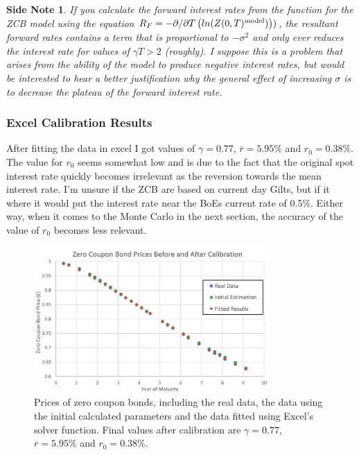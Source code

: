 \documentclass[10pt,a4paper]{article}
\theoremstyle{definition}
\theoremstyle{plain}
\theoremstyle{definition}
\theoremstyle{plain}
\newtheorem{sidenote}{Side Note}[section]
\begin{document}
\theoremstyle{plain}
\begin{sidenote}{}
If you calculate the forward interest rates from the function for the ZCB model using the equation $R_{F}=-\partial / \partial T \left( ln(Z(0,T)^{\rm{model}}) \right))$, the resultant forward rates contains a term that is proportional to $-\sigma^2$ and only ever reduces the interest rate for values of $\gamma T>2$ (roughly). I suppose this is a problem that arises from the ability of the model to produce negative interest rates, but would be interested to hear a better justification why the general effect of increasing $\sigma$ is to decrease the plateau of the forward interest rate.
\end{sidenote}

\subsubsection{Excel Calibration Results}

After fitting the data in excel I got values of $\gamma=0.77$, $\overline{r}=5.95\%$ and $r_0=0.38\%$. The value for $r_0$ seems somewhat low and is due to the fact that the original spot interest rate quickly becomes irrelevant as the reversion towards the mean interest rate. I'm unsure if the ZCB are based on current day Gilts, but if it where it would put the interest rate near the BoEs current rate of 0.5\%. Either way, when it comes to the Monte Carlo in the next section, the accuracy of the value of $r_0$ becomes less relevant.

\begin{figure}[h]
	\centering
	\includegraphics[width=0.8\textwidth]{ExcelCalibrationResults.JPG}
	\caption{Prices of zero coupon bonds, including the real data, the data using the initial calculated parameters and the data fitted using Excel's solver function. Final values after calibration are $\gamma=0.77$, $\overline{r}=5.95\%$ and $r_0=0.38\%$.}
	\label{fig:ExcelCalibration}
\end{figure}
\end{document}
